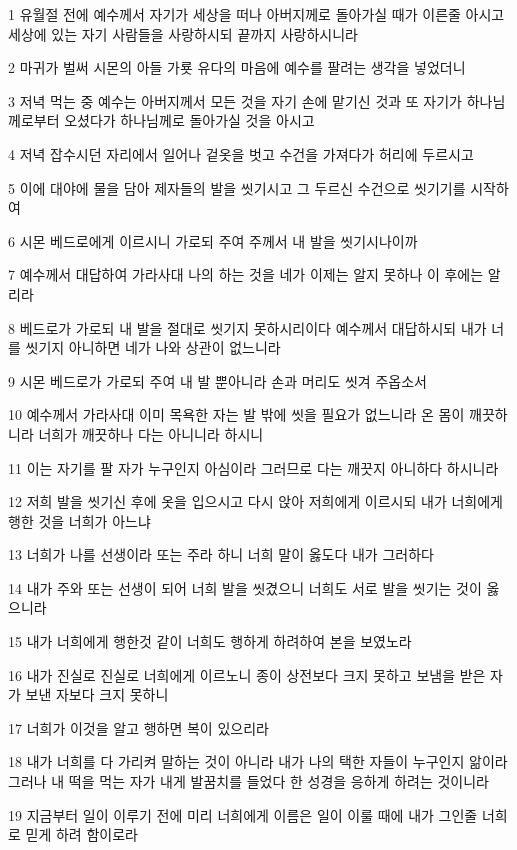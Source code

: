 \par 1 유월절 전에 예수께서 자기가 세상을 떠나 아버지께로 돌아가실 때가 이른줄 아시고 세상에 있는 자기 사람들을 사랑하시되 끝까지 사랑하시니라
\par 2 마귀가 벌써 시몬의 아들 가룟 유다의 마음에 예수를 팔려는 생각을 넣었더니
\par 3 저녁 먹는 중 예수는 아버지께서 모든 것을 자기 손에 맡기신 것과 또 자기가 하나님께로부터 오셨다가 하나님께로 돌아가실 것을 아시고
\par 4 저녁 잡수시던 자리에서 일어나 겉옷을 벗고 수건을 가져다가 허리에 두르시고
\par 5 이에 대야에 물을 담아 제자들의 발을 씻기시고 그 두르신 수건으로 씻기기를 시작하여
\par 6 시몬 베드로에게 이르시니 가로되 주여 주께서 내 발을 씻기시나이까
\par 7 예수께서 대답하여 가라사대 나의 하는 것을 네가 이제는 알지 못하나 이 후에는 알리라
\par 8 베드로가 가로되 내 발을 절대로 씻기지 못하시리이다 예수께서 대답하시되 내가 너를 씻기지 아니하면 네가 나와 상관이 없느니라
\par 9 시몬 베드로가 가로되 주여 내 발 뿐아니라 손과 머리도 씻겨 주옵소서
\par 10 예수께서 가라사대 이미 목욕한 자는 발 밖에 씻을 필요가 없느니라 온 몸이 깨끗하니라 너희가 깨끗하나 다는 아니니라 하시니
\par 11 이는 자기를 팔 자가 누구인지 아심이라 그러므로 다는 깨끗지 아니하다 하시니라
\par 12 저희 발을 씻기신 후에 옷을 입으시고 다시 앉아 저희에게 이르시되 내가 너희에게 행한 것을 너희가 아느냐
\par 13 너희가 나를 선생이라 또는 주라 하니 너희 말이 옳도다 내가 그러하다
\par 14 내가 주와 또는 선생이 되어 너희 발을 씻겼으니 너희도 서로 발을 씻기는 것이 옳으니라
\par 15 내가 너희에게 행한것 같이 너희도 행하게 하려하여 본을 보였노라
\par 16 내가 진실로 진실로 너희에게 이르노니 종이 상전보다 크지 못하고 보냄을 받은 자가 보낸 자보다 크지 못하니
\par 17 너희가 이것을 알고 행하면 복이 있으리라
\par 18 내가 너희를 다 가리켜 말하는 것이 아니라 내가 나의 택한 자들이 누구인지 앎이라 그러나 내 떡을 먹는 자가 내게 발꿈치를 들었다 한 성경을 응하게 하려는 것이니라
\par 19 지금부터 일이 이루기 전에 미리 너희에게 이름은 일이 이룰 때에 내가 그인줄 너희로 믿게 하려 함이로라
